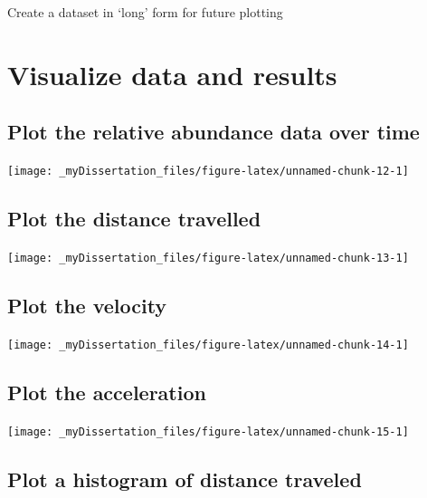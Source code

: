 \documentclass[12pt,twoside,openany]{reedthesis}
\begin{document}
Create a dataset in `long' form for future plotting

\hypertarget{visualize-data-and-results}{%
\section{Visualize data and results}\label{visualize-data-and-results}}

\hypertarget{plot-the-relative-abundance-data-over-time}{%
\subsection{Plot the relative abundance data over time}\label{plot-the-relative-abundance-data-over-time}}
\begin{center}\texttt{[image: \_myDissertation\_files/figure-latex/unnamed-chunk-12-1]} \end{center}

\hypertarget{plot-the-distance-travelled}{%
\subsection{Plot the distance travelled}\label{plot-the-distance-travelled}}
\begin{center}\texttt{[image: \_myDissertation\_files/figure-latex/unnamed-chunk-13-1]} \end{center}

\hypertarget{plot-the-velocity}{%
\subsection{Plot the velocity}\label{plot-the-velocity}}
\begin{center}\texttt{[image: \_myDissertation\_files/figure-latex/unnamed-chunk-14-1]} \end{center}

\hypertarget{plot-the-acceleration}{%
\subsection{Plot the acceleration}\label{plot-the-acceleration}}
\begin{center}\texttt{[image: \_myDissertation\_files/figure-latex/unnamed-chunk-15-1]} \end{center}

\hypertarget{plot-a-histogram-of-distance-traveled}{%
\subsection{Plot a histogram of distance traveled}\label{plot-a-histogram-of-distance-traveled}}
\end{document}
